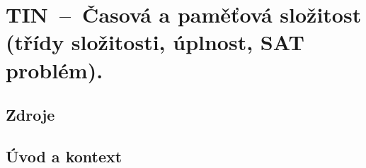 

\graphicspath{{tin/slozitost/figures}}


\chapter{TIN~--~Časová a paměťová složitost (třídy složitosti, úplnost, SAT problém).}


\section{Zdroje}

\begin{compactitem}
    \item {}
    \item {}
    \item {}
    \item {}
    \item {}
\end{compactitem}


\section{Úvod a kontext}




